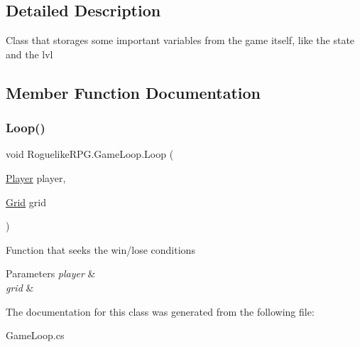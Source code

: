 \subsection{Detailed Description}
Class that storages some important variables from the game itself, like the state and the lvl 



\subsection{Member Function Documentation}
\mbox{\label{class_roguelike_r_p_g_1_1_game_loop_aa012d706ad4d98f0f6fb321d37638c3c}} 
\subsubsection{\texorpdfstring{Loop()}{Loop()}}
{\footnotesize\ttfamily void Roguelike\+R\+P\+G.\+Game\+Loop.\+Loop (\begin{DoxyParamCaption}\item[{\mbox{\hyperlink{class_roguelike_r_p_g_1_1_player}{Player}}}]{player,  }\item[{\mbox{\hyperlink{class_roguelike_r_p_g_1_1_grid}{Grid}}}]{grid }\end{DoxyParamCaption})\hspace{0.3cm}{\ttfamily [inline]}}



Function that seeks the win/lose conditions 


\begin{DoxyParams}{Parameters}
{\em player} & \\
\hline
{\em grid} & \\
\hline
\end{DoxyParams}


The documentation for this class was generated from the following file\+:\begin{DoxyCompactItemize}
\item 
Game\+Loop.\+cs\end{DoxyCompactItemize}
